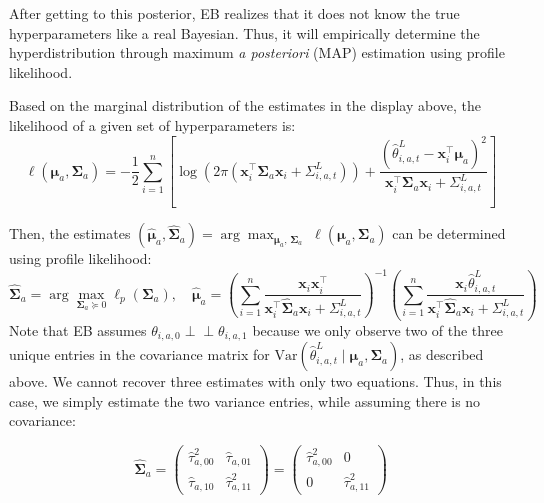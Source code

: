 \documentclass[letterpaper, 9pt]{extarticle}
\begin{document}
After getting to this posterior, EB realizes that it does not know the true hyperparameters like a real Bayesian. Thus, it will empirically determine the hyperdistribution through maximum \textit{a posteriori} (MAP) estimation using profile likelihood. 

Based on the marginal distribution of the estimates in the display above, the likelihood of a given set of hyperparameters is:
$$\ell(\boldsymbol{\mu}_a,\boldsymbol{\Sigma}_a)
=
-\frac12
\sum_{i=1}^n
\left[
\log\!\left(
2\pi\left(
\boldsymbol{x}_i^\top\boldsymbol{\Sigma}_a\boldsymbol{x}_i+\Sigma_{i,a,t}^{L}
\right)
\right)
+
\frac{
\left(
\hat{\theta}^{L}_{i,a,t}-\boldsymbol{x}_i^\top\boldsymbol{\mu}_a
\right)^2
}{
\boldsymbol{x}_i^\top\boldsymbol{\Sigma}_a\boldsymbol{x}_i+\Sigma_{i,a,t}^{L}
}
\right]$$

Then, the estimates $(\hat{\boldsymbol{\mu}}_a, \hat{\boldsymbol{\Sigma}}_a)
=
\arg\max_{\boldsymbol{\mu}_a,\,\boldsymbol{\Sigma}_a}
\;\ell(\boldsymbol{\mu}_a, \boldsymbol{\Sigma}_a)$ can be determined using profile likelihood: 
\[
\hat{\boldsymbol{\Sigma}}_a
=
\arg\max_{\boldsymbol{\Sigma}_a \succeq 0}
\ell_p(\boldsymbol{\Sigma}_a),
\quad
\hat{\boldsymbol{\mu}}_a
=
\left(
\sum_{i=1}^{n}
\frac{\boldsymbol{x}_i\boldsymbol{x}_i^\top}
{\boldsymbol{x}_i^\top \hat{\boldsymbol{\Sigma}}_a \boldsymbol{x}_i+\Sigma^{L}_{i,a,t}}
\right)^{-1}
\left(
\sum_{i=1}^{n}
\frac{\boldsymbol{x}_i \hat{\theta}^{L}_{i,a,t}}
{\boldsymbol{x}_i^\top \hat{\boldsymbol{\Sigma}}_a \boldsymbol{x}_i+\Sigma^{L}_{i,a,t}}
\right)
\]
Note that EB assumes $\theta_{i,a,0} \perp\!\!\!\!\perp \theta_{i,a,1}$ because we only observe two of the three unique entries in the covariance matrix for $\text{Var}(\hat{\theta}^L_{i,a,t} \mid \boldsymbol{\mu}_a, \boldsymbol{\Sigma}_a)$, as described above. We cannot recover three estimates with only two equations. Thus, in this case, we simply estimate the two variance entries, while assuming there is no covariance:

$$\hat{\boldsymbol{\Sigma}}_a = \begin{pmatrix} \hat{\tau}_{a,00}^2 & \hat{\tau}_{a,01} \\ \hat{\tau}_{a,10} & \hat{\tau}_{a,11}^2 \end{pmatrix} = \begin{pmatrix} \hat{\tau}_{a,00}^2 & 0 \\ 0 & \hat{\tau}_{a,11}^2 \end{pmatrix}$$
\end{document}
